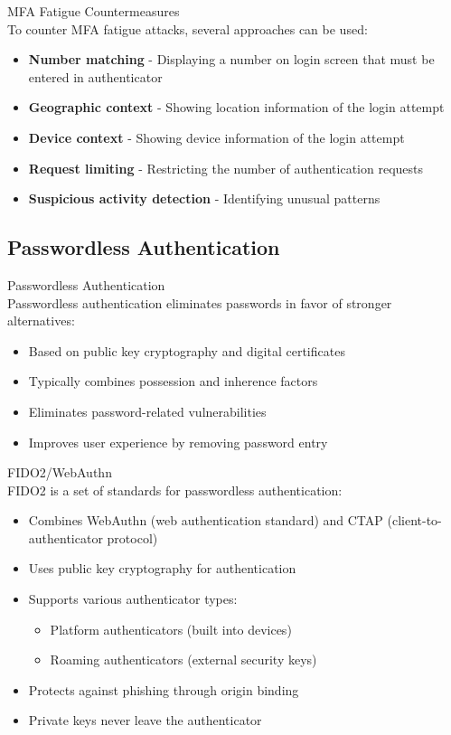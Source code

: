 \begin{concept}{MFA Fatigue Countermeasures}\\
To counter MFA fatigue attacks, several approaches can be used:
\begin{itemize}
    \item \textbf{Number matching} - Displaying a number on login screen that must be entered in authenticator
    \item \textbf{Geographic context} - Showing location information of the login attempt
    \item \textbf{Device context} - Showing device information of the login attempt
    \item \textbf{Request limiting} - Restricting the number of authentication requests
    \item \textbf{Suspicious activity detection} - Identifying unusual patterns
\end{itemize}
\end{concept}

\subsection{Passwordless Authentication}

\begin{definition}{Passwordless Authentication}\\
Passwordless authentication eliminates passwords in favor of stronger alternatives:
\begin{itemize}
    \item Based on public key cryptography and digital certificates
    \item Typically combines possession and inherence factors
    \item Eliminates password-related vulnerabilities
    \item Improves user experience by removing password entry
\end{itemize}
\end{definition}

\begin{concept}{FIDO2/WebAuthn}\\
FIDO2 is a set of standards for passwordless authentication:
\begin{itemize}
    \item Combines WebAuthn (web authentication standard) and CTAP (client-to-authenticator protocol)
    \item Uses public key cryptography for authentication
    \item Supports various authenticator types:
    \begin{itemize}
        \item Platform authenticators (built into devices)
        \item Roaming authenticators (external security keys)
    \end{itemize}
    \item Protects against phishing through origin binding
    \item Private keys never leave the authenticator
\end{itemize}
\end{concept}

